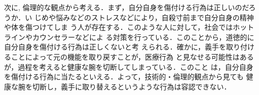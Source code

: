 \documentclass{jsarticle}
\begin{document}
\hspace*{8.4zw}次に, 倫理的な観点から考える．まず，自分自身を傷付ける行為は正しいのだろうか．い
\hspace*{8.4zw}じめや悩みなどのストレスなどにより，自殺寸前まで自分自身の精神や体を傷つけてしま
\hspace*{8.4zw}う人が存在する．このような人に対して，社会ではホットラインやカウンセラーなどによ
\hspace*{8.4zw}る対策を行っている．このことから，道徳的に自分自身を傷付ける行為は正しくないと考
\hspace*{8.4zw}えられる．確かに，義手を取り付けることによって元の機能を取り戻すことが，医療行為
\hspace*{8.4zw}と見なせる可能性はあるが，過程を考えると健康な腕を切断してしまっている．このこと
\hspace*{8.4zw}は，自分自身を傷付ける行為に当たるといえる．よって，技術的・倫理的観点から見ても
\hspace*{8.4zw}健康な腕を切断し，義手に取り替えるというような行為は容認できない．
\end{document}
